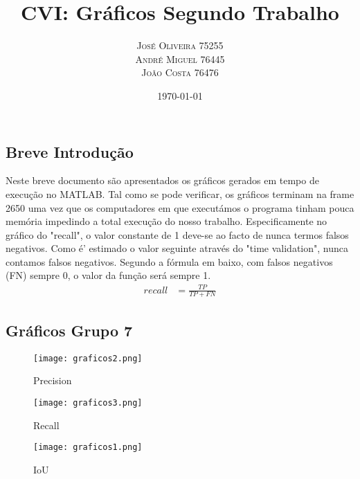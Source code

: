 \documentclass{article}
\begin{document}
\title{CVI: Gr\'aficos Segundo Trabalho}
\author{
\textsc{Jos\'e Oliveira}
\normalsize 75255 \\
\textsc{Andr\'e Miguel}
\normalsize 76445 \\
\textsc{Jo\~ao Costa}
\normalsize 76476 \\
}
\date{\today}
\maketitle

\subsection*{Breve Introdu\c{c}\~ao}
Neste breve documento s\~ao apresentados os gr\'aficos gerados em tempo de execu\c{c}\~ao no MATLAB. Tal como se pode verificar, os gr\'aficos terminam na frame 2650 uma vez que os computadores em que execut\'amos o programa tinham pouca mem\'oria impedindo a total execu\c{c}ão do nosso trabalho.
Especificamente no gr\'afico do "recall", o valor constante de 1 deve-se ao facto de nunca termos falsos negativos. Como \'e' estimado o valor seguinte atrav\'es do "time validation", nunca contamos falsos negativos. Segundo a f\'ormula em baixo, com falsos negativos (FN) sempre 0, o valor da fun\c{c}\~ao ser\'a sempre 1.
\begin{align*}
    recall &= \frac{TP}{TP + FN}
\end{align*}

\subsection*{Gr\'aficos Grupo 7}

\begin{figure}[ht!]
\centering
\texttt{[image: graficos2.png]}
\caption{Precision \label{overflow}}
\end{figure}

\begin{figure}[ht!]
\centering
\texttt{[image: graficos3.png]}
\caption{Recall \label{overflow}}
\end{figure}

\begin{figure}[ht!]
\centering
\texttt{[image: graficos1.png]}
\caption{IoU \label{overflow}}
\end{figure}
\end{document}
